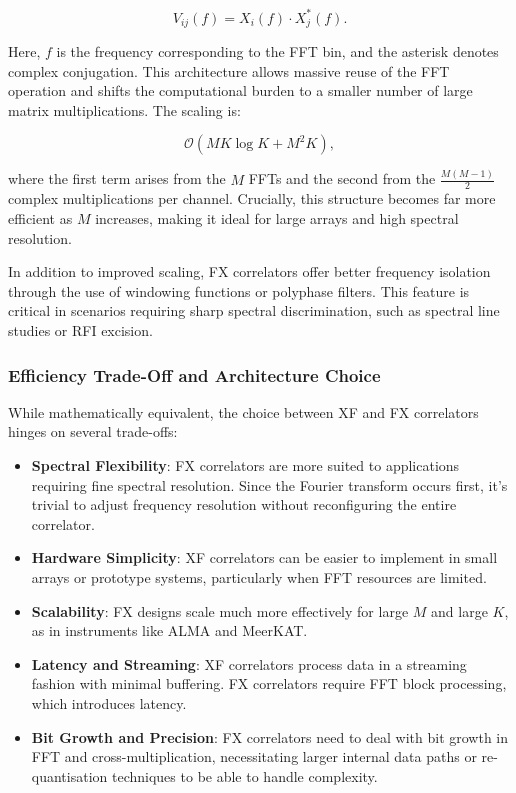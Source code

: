         \begin{equation}
            V_{ij}(f) = X_i(f) \cdot X_j^*(f).
        \end{equation}

        Here, \( f \) is the frequency corresponding to the FFT bin, and the asterisk denotes complex conjugation. This architecture allows massive reuse of the FFT operation and shifts the computational burden to a smaller number of large matrix multiplications. The scaling is:

        \begin{equation}
            \mathcal{O}\left(M K \log K + M^2 K\right),
        \end{equation}

        where the first term arises from the \( M \) FFTs and the second from the \( \frac{M(M-1)}{2} \) complex multiplications per channel. Crucially, this structure becomes far more efficient as \( M \) increases, making it ideal for large arrays and high spectral resolution.

        In addition to improved scaling, FX correlators offer better frequency isolation through the use of windowing functions or polyphase filters. This feature is critical in scenarios requiring sharp spectral discrimination, such as spectral line studies or RFI excision.

        \subsubsection*{Efficiency Trade-Off and Architecture Choice}
        While mathematically equivalent, the choice between XF and FX correlators hinges on several trade-offs:

                \begin{itemize}
            \item \textbf{Spectral Flexibility}: FX correlators are more suited to applications requiring fine spectral resolution. Since the Fourier transform occurs first, it’s trivial to adjust frequency resolution without reconfiguring the entire correlator.
            
            \item \textbf{Hardware Simplicity}: XF correlators can be easier to implement in small arrays or prototype systems, particularly when FFT resources are limited.
            
           \item \textbf{Scalability}: FX designs scale much more effectively for large \( M \) and large \( K \), as in instruments like ALMA and MeerKAT.
           
            \item \textbf{Latency and Streaming}: XF correlators process data in a streaming fashion with minimal buffering. FX correlators require FFT block processing, which introduces latency.
            
            \item \textbf{Bit Growth and Precision}: FX correlators need to deal with bit growth in FFT and cross-multiplication, necessitating larger internal data paths or re-quantisation techniques to be able to handle complexity.
        \end{itemize}

